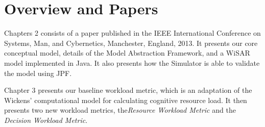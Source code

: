 \begin{comment}
   Known high and low workload scenarios, similar to those in WiSAR, are placed in the model.  Workload is consistent if it rises and falls as expected given known scenarios, and a {\em sensitivity}We were very pleased with the results of this case study.  Firstly because the Model Abstraction Framework proved capable of expressing our highly abstracted model.  Second, by using a {\em consistency}

using the Workload Viewer we were able to show that the Model Abstraction Framework is capable of expressing a UAS using high levels of abstraction.  The results of   They also demonstrate the ability to model systems using varying degrees of abstraction.  The verification of the metrics in this thesis is done by a {\em consistency} approach, showing that workload rises and falls as expected given known difficult and easy scenarios, respectively.  Future work will provide a more detailed verification.
\end{comment}

\section{Overview and Papers}

Chapters 2 consists of a paper published in the IEEE International Conference on Systems, Man, and Cybernetics, Manchester, England, 2013. It presents our core conceptual model, details of the Model Abstraction Framework, and a WiSAR model implemented in Java.  It also presents how the Simulator is able to validate the model using JPF.

\begin{comment}
Chapter 3 presents an extension of our conceptual model in the form of the DiTG.  It also presents a formal taxonomy of workload metrics and how that taxonomy applies to our conceptual model.  Lastly it reports the results of adding the workload metrics into the simulation framework.  Much of the work performed for this paper was completed by others; it has been added to this thesis for completeness.


Chapter 4 presents an XML Model Extension for the Model Abstraction Framework which makes it easier for the modeler to create a labeled state transition system and reduces the likelihood of coding errors in the resulting Java implementation of that system.
\end{comment}

Chapter 3 presents our baseline workload metric, which is an adaptation of the Wickens' computational model for calculating cognitive resource load\cite{wickens2002multiple}.  It then presents two new workload metrics, the{\em Resource Workload Metric} and the {\em Decision Workload Metric}.

